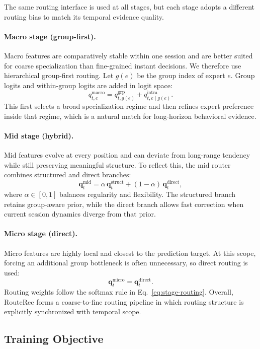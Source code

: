 \documentclass[sigconf,anonymous,review]{acmart-primary/acmart}
\begin{document}
The same routing interface is used at all stages, but each stage adopts a different routing bias to match its temporal evidence quality.

\paragraph{Macro stage (group-first).}
Macro features are comparatively stable within one session and are better suited for coarse specialization than fine-grained instant decisions. We therefore use hierarchical group-first routing. Let $g(e)$ be the group index of expert $e$. Group logits and within-group logits are added in logit space:
\[
q^{\mathrm{macro}}_{t,e}=q^{\mathrm{grp}}_{t,g(e)}+q^{\mathrm{intra}}_{t,e\mid g(e)}.
\]
This first selects a broad specialization regime and then refines expert preference inside that regime, which is a natural match for long-horizon behavioral evidence.

\paragraph{Mid stage (hybrid).}
Mid features evolve at every position and can deviate from long-range tendency while still preserving meaningful structure. To reflect this, the mid router combines structured and direct branches:
\[
\mathbf{q}^{\mathrm{mid}}_t=\alpha\,\mathbf{q}^{\mathrm{struct}}_t+(1-\alpha)\,\mathbf{q}^{\mathrm{direct}}_t,
\]
where $\alpha\in[0,1]$ balances regularity and flexibility. The structured branch retains group-aware prior, while the direct branch allows fast correction when current session dynamics diverge from that prior.

\paragraph{Micro stage (direct).}
Micro features are highly local and closest to the prediction target. At this scope, forcing an additional group bottleneck is often unnecessary, so direct routing is used:
\[
\mathbf{q}^{\mathrm{micro}}_t=\mathbf{q}^{\mathrm{direct}}_t.
\]
Routing weights follow the softmax rule in Eq.~\eqref{eq:stage-routing}. Overall, RouteRec forms a coarse-to-fine routing pipeline in which routing structure is explicitly synchronized with temporal scope.

\subsection{Training Objective}
\label{sec:training-objective}
\end{document}
